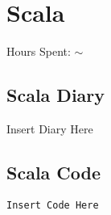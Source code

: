\documentclass{report}
\begin{document}
\section*{Scala}
Hours Spent: $\sim$
\subsection*{Scala Diary}
Insert Diary Here

\subsection*{Scala Code}
\begin{lstlisting}
Insert Code Here
\end{lstlisting}
\end{document}
